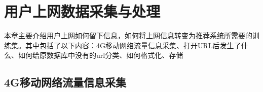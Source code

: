 \chapter{用户上网数据采集与处理}
本章主要介绍用户上网如何留下信息，如何将上网信息转变为推荐系统所需要的训练集。其中包括了以下内容：4G移动网络流量信息采集、打开URL后发生了什么、如何给原数据库中没有的url分类、如何格式化、存储
\section{4G移动网络流量信息采集}
